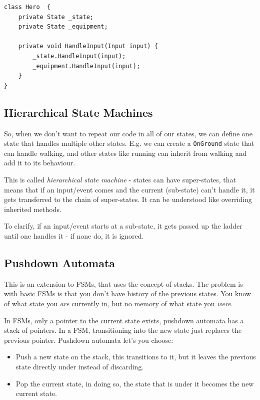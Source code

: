 \documentclass[a4paper, 12pt]{book}
\begin{document}
\begin{verbatim}
class Hero  {
    private State _state;
    private State _equipment;

    private void HandleInput(Input input) {
        _state.HandleInput(input);
        _equipment.HandleInput(input);
    }
}
\end{verbatim}

\subsection{Hierarchical State Machines}

So, when we don't want to repeat our code in all of our states, we can define one state that handles multiple other states. E.g. we can create a \texttt{OnGround} state that can handle walking, and other states like running can inherit from walking and add it to its behaviour.


This is called \emph{hierarchical state machine} - states can have super-states, that means that if an input/event comes and the current (sub-state) can't handle it, it gets transferred to the chain of super-states. It can be understood like overriding inherited methods.

To clarify, if an input/event starts at a sub-state, it gets passed up the ladder until one handles it - if none do, it is ignored.

\subsection{Pushdown Automata}

This is an extension to FSMs, that uses the concept of stacks. The problem is with basic FSMs is that you don't have history of the previous states. You know of what state you \emph{are} currently in, but no memory of what state you \emph{were}.

In FSMs, only a pointer to the current state exists, pushdown automata has a stack of pointers. In a FSM, transitioning into the new state just replaces the previous pointer. Pushdown automata let's you choose:
\begin{itemize}
    \item Push a new state on the stack, this transitions to it, but it leaves the previous state directly under instead of discarding.
    \item Pop the current state, in doing so, the state that is under it becomes the new current state.
\end{itemize}
\end{document}
